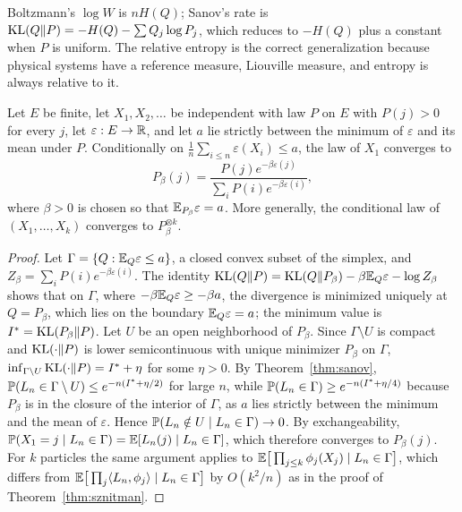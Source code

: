 Boltzmann's $\log W$ is $nH(Q)$; Sanov's rate is $\KL(Q\|P) = -H(Q) - \sum Q_j\log P_j$, which reduces to $-H(Q)$ plus a constant when $P$ is uniform. The relative entropy is the correct generalization because physical systems have a reference measure, Liouville measure, and entropy is always relative to it.

\begin{theorem}
\label{thm:gibbs_conditioning}
Let $E$ be finite, let $X_1,X_2,\dots$ be independent with law $P$ on $E$ with $P(j)>0$ for every $j$, let $\varepsilon:E\to\R$, and let $a$ lie strictly between the minimum of $\varepsilon$ and its mean under $P$. Conditionally on $\frac1n\sum_{i\leq n}\varepsilon(X_i)\leq a$, the law of $X_1$ converges to
\[
P_\beta(j) = \frac{P(j)e^{-\beta\varepsilon(j)}}{\sum_i P(i)e^{-\beta\varepsilon(i)}},
\]
where $\beta>0$ is chosen so that $\E_{P_\beta}\varepsilon = a$. More generally, the conditional law of $(X_1,\dots,X_k)$ converges to $P_\beta^{\otimes k}$.
\end{theorem}

\begin{proof}
Let $\Gamma = \{Q:\E_Q\varepsilon\leq a\}$, a closed convex subset of the simplex, and $Z_\beta = \sum_iP(i)e^{-\beta\varepsilon(i)}$. The identity $\KL(Q\|P) = \KL(Q\|P_\beta)-\beta\E_Q\varepsilon-\log Z_\beta$ shows that on $\Gamma$, where $-\beta\E_Q\varepsilon\geq-\beta a$, the divergence is minimized uniquely at $Q = P_\beta$, which lies on the boundary $\E_Q\varepsilon = a$; the minimum value is $I^* = \KL(P_\beta\|P)$. Let $U$ be an open neighborhood of $P_\beta$. Since $\Gamma\setminus U$ is compact and $\KL(\cdot\|P)$ is lower semicontinuous with unique minimizer $P_\beta$ on $\Gamma$, $\inf_{\Gamma\setminus U}\KL(\cdot\|P) = I^*+\eta$ for some $\eta>0$. By Theorem~\ref{thm:sanov}, $\P(L_n\in\Gamma\setminus U)\leq e^{-n(I^*+\eta/2)}$ for large $n$, while $\P(L_n\in\Gamma)\geq e^{-n(I^*+\eta/4)}$ because $P_\beta$ is in the closure of the interior of $\Gamma$, as $a$ lies strictly between the minimum and the mean of $\varepsilon$. Hence $\P(L_n\notin U\mid L_n\in\Gamma)\to0$. By exchangeability, $\P(X_1 = j\mid L_n\in\Gamma) = \E[L_n(j)\mid L_n\in\Gamma]$, which therefore converges to $P_\beta(j)$. For $k$ particles the same argument applies to $\E\big[\prod_{j\leq k}\phi_j(X_j)\mid L_n\in\Gamma\big]$, which differs from $\E\big[\prod_j\langle L_n,\phi_j\rangle\mid L_n\in\Gamma\big]$ by $O(k^2/n)$ as in the proof of Theorem~\ref{thm:sznitman}.
\end{proof}

